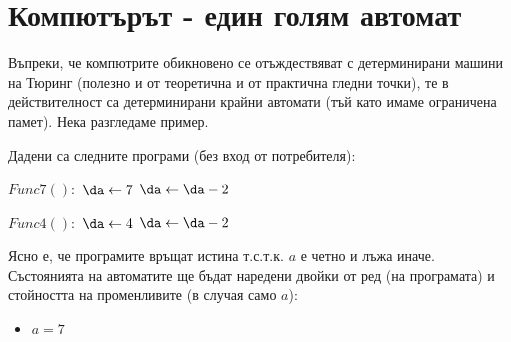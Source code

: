 \vspace{-0.5cm}
\section{Компютърът - един голям автомат}
\vspace{-0.2cm}
Въпреки, че компютрите обикновено се отъждествяват с детерминирани машини на Тюринг (полезно и от теоретична и от практична гледни точки), те в действителност са детерминирани крайни автомати (тъй като имаме ограничена памет). Нека разгледаме пример.\newline

\begin{examplecp}
	Дадени са следните програми (без вход от потребителя):
	\begin{pseudocode}
		
		$Func7():$
		\Mybegin
		{	
			$\da\leftarrow7$\;
			{
				$\da\leftarrow\da-2$\;
			}
		}
	\end{pseudocode}
	\begin{pseudocode}
		\SetKwData{da}{a}
		
		$Func4():$
		\Mybegin
		{	
			$\da\leftarrow4$\;
			\While{$\da>1$}
			{
				$\da\leftarrow\da-2$\;
			}
			\KwRet{$\da=0$\;}
		}
	\end{pseudocode}
	\noindent
	Ясно е, че програмите връщат истина т.с.т.к. $a$ е четно и лъжа иначе. Състоянията на автоматите ще бъдат наредени двойки от ред (на програмата) и стойността на променливите (в случая само $a$):
	\begin{itemize}
		\item $a=7$
		\begin{figure}[H]
			\centering
\end{figure}
\end{itemize}
\end{examplecp}
